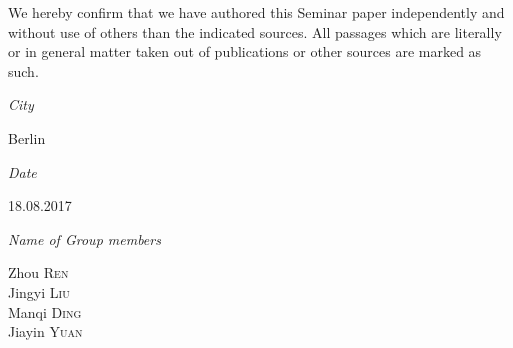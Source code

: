 \documentclass[12pt, a4paper, bibliography=totoc, english]{scrartcl}
\begin{document}
\printbibliography


We hereby confirm that we have authored this Seminar paper independently and without use of others than the indicated sources. All passages which are literally or in general matter taken out of publications or other sources are marked as such.



\emph{City}            \begin{flushright}
	Berlin\\
\end{flushright}

\emph{Date}            \begin{flushright}
	18.08.2017\\
\end{flushright}

\emph{Name of Group members}\\
\begin{flushright}
	Zhou \textsc{Ren}\\
	Jingyi \textsc{Liu}\\
	Manqi \textsc{Ding}\\
	Jiayin \textsc{Yuan}
\end{flushright}




\end{document}
